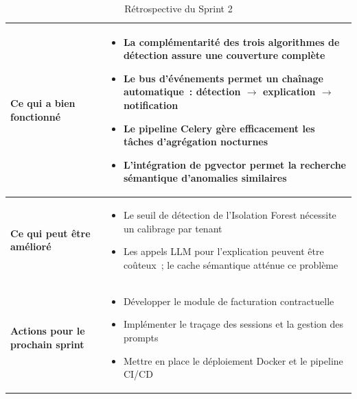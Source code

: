 \begin{table}[H]
\centering
\caption{Rétrospective du Sprint 2}
\label{tab:retro_s2}
\begin{tabularx}{\textwidth}{|l|X|}
\hline
\textbf{Ce qui a bien fonctionné} & \begin{minipage}[t]{\linewidth}\vspace{2pt}
\begin{itemize}[noitemsep,topsep=0pt]
\item La complémentarité des trois algorithmes de détection assure une couverture complète
\item Le bus d'événements permet un chaînage automatique~: détection $\rightarrow$ explication $\rightarrow$ notification
\item Le pipeline Celery gère efficacement les tâches d'agrégation nocturnes
\item L'intégration de pgvector permet la recherche sémantique d'anomalies similaires
\end{itemize}\vspace{2pt}
\end{minipage} \\
\hline
\textbf{Ce qui peut être amélioré} & \begin{minipage}[t]{\linewidth}\vspace{2pt}
\begin{itemize}[noitemsep,topsep=0pt]
\item Le seuil de détection de l'Isolation Forest nécessite un calibrage par tenant
\item Les appels LLM pour l'explication peuvent être coûteux~; le cache sémantique atténue ce problème
\end{itemize}\vspace{2pt}
\end{minipage} \\
\hline
\textbf{Actions pour le prochain sprint} & \begin{minipage}[t]{\linewidth}\vspace{2pt}
\begin{itemize}[noitemsep,topsep=0pt]
\item Développer le module de facturation contractuelle
\item Implémenter le traçage des sessions et la gestion des prompts
\item Mettre en place le déploiement Docker et le pipeline CI/CD
\end{itemize}\vspace{2pt}
\end{minipage} \\
\hline
\end{tabularx}
\end{table}


